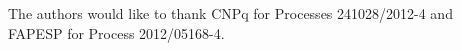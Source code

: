 The authors would like to thank CNPq for Processes 241028/2012-4 and FAPESP for Process 2012/05168-4.